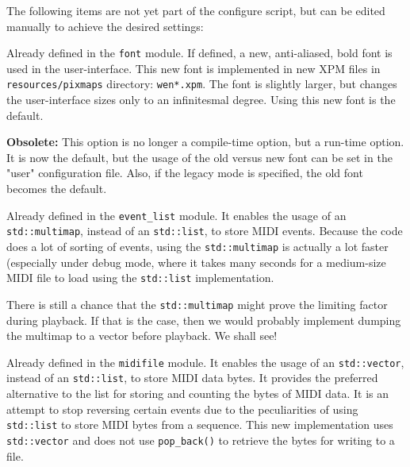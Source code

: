    The following items are not yet part of the configure script, but can
   be edited manually to achieve the desired settings:

   \setcounter{ItemCounter}{0}      %
   
        Already defined in the \texttt{font} module.
        If defined, a new, anti-aliased,
        bold font is used in the user-interface.  This new font is implemented
        in new XPM files in \texttt{resources/pixmaps} directory:
        \texttt{wen*.xpm}.  The font is slightly
        larger, but changes the user-interface sizes only to an infinitesmal
        degree.  Using this new font is the default.

        \textbf{Obsolete:}
        This option is no longer a compile-time option, but a run-time option.
        It is now the default, but the usage of the old versus new font can be
        set in the "user" configuration file.
        Also, if the legacy mode is specified, the old font becomes the
        default.

        Already defined in the \texttt{event\_list} module.
        It enables the usage of an
        \texttt{std::multimap}, instead of an \texttt{std::list},
        to store MIDI events.  Because
        the code does a lot of sorting of events, using the
        \texttt{std::multimap} is actually a lot faster (especially under debug
        mode, where it takes
        many seconds for a medium-size MIDI file to load using the
        \texttt{std::list} implementation.

        There is still a chance that the \texttt{std::multimap} might prove the
        limiting factor during playback.  If that is the case, then we would
        probably implement dumping the multimap to a vector before playback.
        We shall see!

        Already defined in the \texttt{midifile} module.
        It enables the usage of an
        \texttt{std::vector}, instead of an \texttt{std::list},
        to store MIDI data bytes.
        It provides the preferred alternative to the list for storing and
        counting the bytes of MIDI data.  It is an attempt to stop reversing
        certain events due to the peculiarities of using \texttt{std::list} to
        store MIDI bytes from a sequence.  This new implementation uses
        \texttt{std::vector} and does not use \texttt{pop\_back()} to retrieve
        the bytes for writing to a file.

